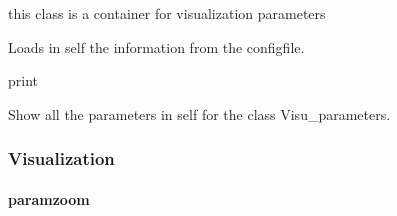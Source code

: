 \documentclass[letterpaper,10pt,openany,oneside]{sphinxmanual}
\begin{document}
\begin{fulllineitems}
\label{rst/visu2d:Visu.Load.Visu_Parameters}
this class is a container for visualization parameters

\begin{fulllineitems}
\label{rst/visu2d:Visu.Load.Visu_Parameters.load}
Loads in self the information from the configfile.

\end{fulllineitems}


\begin{fulllineitems}
\label{rst/visu2d:Visu.Load.Visu_Parameters.pr}
print

\end{fulllineitems}


\begin{fulllineitems}
\label{rst/visu2d:Visu.Load.Visu_Parameters.report}
Show all the parameters in self for the class Visu\_parameters.

\end{fulllineitems}


\end{fulllineitems}



\subsubsection{Visualization}
\label{rst/visu2d:visualization}

\paragraph{paramzoom}
\label{rst/visu2d:paramzoom}\label{rst/visu2d:module-Visu.paramzoom}
\end{document}
